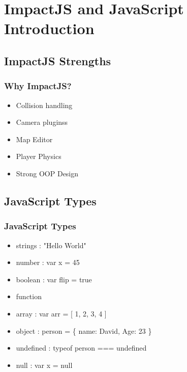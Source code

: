 \documentclass[red]{beamer}
\begin{document}
\begin{frame}
  \titlepage
\end{frame}

\section[Outline]{}

\section{ImpactJS and JavaScript Introduction}

\subsection{ImpactJS Strengths}

\begin{frame}
  \frametitle{Why ImpactJS?}   %

  \begin{itemize}
  \item Collision handling
  \item Camera pluginss
  \item Map Editor
  \item Player Physics
  \item Strong OOP Design
  \end{itemize}
\end{frame}

\subsection{JavaScript Types}

\begin{frame}
	\frametitle{JavaScript Types}
	 \begin{itemize}
  		\item<1-> strings : "Hello World"
 		\item<2-> number : var x = 45
 		\item<3-> boolean : var flip = true
		\item<4-> function
		\item<4-> array : var arr = [ 1, 2, 3, 4 ]
		\item<5->object : person = \{ name: David, Age: 23 \}
		\item<6->undefined : typeof person === undefined
		\item<7->null : var x = null
 	 \end{itemize}
\end{frame}
\end{document}
